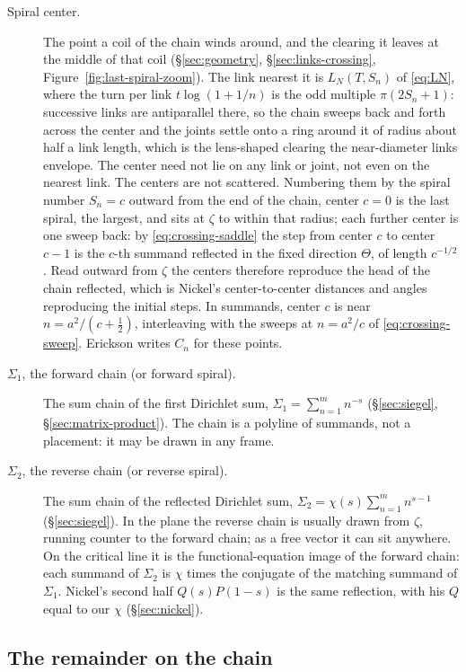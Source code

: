 \documentclass[11pt]{article}
\theoremstyle{definition}
\begin{document}
\begin{description}
\item[Spiral center.]
The point a coil of the chain winds around, and the clearing it
leaves at the middle of that coil
(\S\ref{sec:geometry}, \S\ref{sec:links-crossing},
Figure~\ref{fig:last-spiral-zoom}).
The link nearest it is $L_N(T,S_n)$ of \eqref{eq:LN}, where the turn
per link $t\log(1+1/n)$ is the odd multiple $\pi(2S_n+1)$: successive
links are antiparallel there, so the chain sweeps back and forth
across the center and the joints settle onto a ring around it of
radius about half a link length, which is the lens-shaped clearing
the near-diameter links envelope. The center need not lie on any link
or joint, not even on the nearest link.
The centers are not scattered. Numbering them by the spiral number
$S_n=c$ outward from the end of the chain, center $c=0$ is the last
spiral, the largest, and sits at $\zeta$ to within that radius; each
further center is one sweep back: by
\eqref{eq:crossing-saddle} the step from center $c$ to center $c-1$ is
the $c$-th summand reflected in the fixed direction $\Theta$, of
length $c^{-1/2}$. Read outward from $\zeta$ the centers therefore
reproduce the head of the chain reflected, which is Nickel's
center-to-center distances and angles reproducing the initial steps.
In summands, center $c$ is near $n=a^{2}/(c+\tfrac12)$, interleaving
with the sweeps at $n=a^{2}/c$ of \eqref{eq:crossing-sweep}.
Erickson writes $C_n$ for these points.

\item[$\Sigma_1$, the forward chain (or forward spiral).]
The sum chain of the first Dirichlet sum,
$\Sigma_1=\sum_{n=1}^{m}n^{-s}$
(\S\ref{sec:siegel}, \S\ref{sec:matrix-product}).
The chain is a polyline of summands, not a placement: it may be
drawn in any frame.

\item[$\Sigma_2$, the reverse chain (or reverse spiral).]
The sum chain of the reflected Dirichlet sum,
$\Sigma_2=\chi(s)\sum_{n=1}^{m}n^{s-1}$
(\S\ref{sec:siegel}).
In the plane the reverse chain is usually drawn from $\zeta$,
running counter to the forward chain; as a free vector it can sit
anywhere.
On the critical line it is the functional-equation image of the
forward chain: each summand of $\Sigma_2$ is $\chi$ times the
conjugate of the matching summand of $\Sigma_1$.
Nickel's second half $Q(s)P(1-s)$ is the same reflection, with his
$Q$ equal to our $\chi$ (\S\ref{sec:nickel}).
\end{description}

\subsection*{The remainder on the chain}
\end{document}
